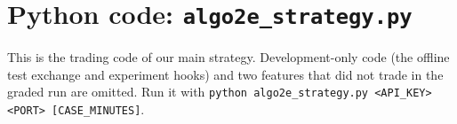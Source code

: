 \section{Python code: \texttt{algo2e\_strategy.py}}\label{app:code}
This is the trading code of our main strategy. Development-only code (the offline test exchange and experiment hooks) and two features that did not trade in the graded run are omitted.
Run it with \texttt{python algo2e\_strategy.py <API\_KEY> <PORT> [CASE\_MINUTES]}.


